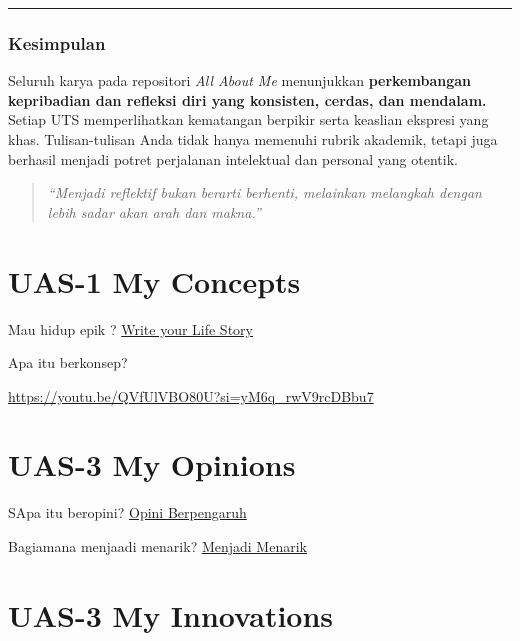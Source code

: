 \documentclass[
  letterpaper,
  DIV=11,
  numbers=noendperiod]{scrreprt}
\begin{document}
\begin{center}\rule{0.5\linewidth}{0.5pt}\end{center}

\subsection{Kesimpulan}\label{kesimpulan}

Seluruh karya pada repositori \emph{All About Me} menunjukkan
\textbf{perkembangan kepribadian dan refleksi diri yang konsisten,
cerdas, dan mendalam.} Setiap UTS memperlihatkan kematangan berpikir
serta keaslian ekspresi yang khas. Tulisan-tulisan Anda tidak hanya
memenuhi rubrik akademik, tetapi juga berhasil menjadi potret perjalanan
intelektual dan personal yang otentik.

\begin{quote}
\emph{``Menjadi reflektif bukan berarti berhenti, melainkan melangkah
dengan lebih sadar akan arah dan makna.''}
\end{quote}


\chapter{UAS-1 My Concepts}\label{uas-1-my-concepts}

Mau hidup epik ? \href{lifestory.pdf}{Write your Life Story}

Apa itu berkonsep?

\url{https://youtu.be/QVfUlVBO80U?si=yM6q_rwV9rcDBbu7}


\chapter{UAS-3 My Opinions}\label{uas-3-my-opinions}

SApa itu beropini? \href{BM\%20Opini.mp4}{Opini Berpengaruh}

Bagiamana menjaadi menarik? \href{./Interesting.mp4}{Menjadi Menarik}


\chapter{UAS-3 My Innovations}\label{uas-3-my-innovations}

\end{document}
